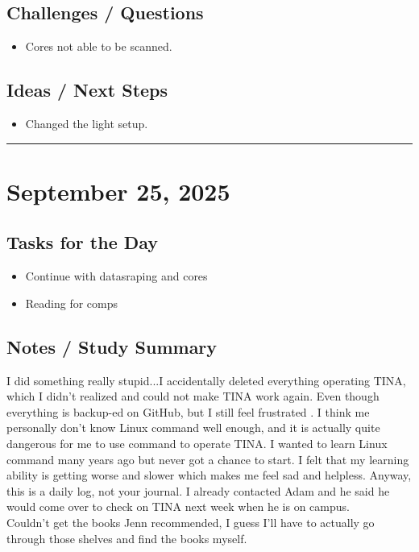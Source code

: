\documentclass[12pt]{article}
\begin{document}
\subsection*{Challenges / Questions}
\begin{itemize}
    \item Cores not able to be scanned.
\end{itemize}

\subsection*{Ideas / Next Steps}
\begin{itemize}
    \item Changed the light setup.
\end{itemize}

\vspace{1em}
\hrule
\vspace{1em}
\section*{September 25, 2025}

\subsection*{Tasks for the Day}
\begin{itemize}
    \item Continue with datasraping and cores
    \item Reading for comps
\end{itemize}
\subsection*{Notes / Study Summary}
I did something really stupid...I accidentally deleted everything operating TINA, which I didn't realized and could not make TINA work again. Even though everything is backup-ed on GitHub, but I still feel frustrated . I think me personally don't know Linux command well enough, and it is actually quite dangerous for me to use command to operate TINA. I wanted to learn Linux command many years ago but never got a chance to start. I felt that my learning ability is getting worse and slower which makes me feel sad and helpless. Anyway, this is a daily log, not your journal. I already contacted Adam and he said he would come over to check on TINA next week when he is on campus.\\
Couldn't get the books Jenn recommended, I guess I'll have to actually go through those shelves and find the books myself. 
\end{document}
